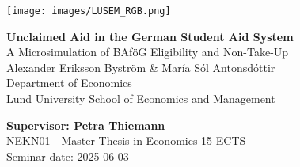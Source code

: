 
\sloppy  %

\texttt{[image: images/LUSEM\_RGB.png]} %

\vspace{2cm}
\begin{center}       
    \vspace*{2cm}
    {\LARGE \textbf{Unclaimed Aid in the German Student Aid System} \\ 
    A Microsimulation of BAföG Eligibility and Non-Take-Up} \\
    \vspace{1cm}
    \Large Alexander Eriksson Byström \& María Sól Antonsdóttir \\[0.3cm]
    \normalsize Department of Economics \\ 
    Lund University School of Economics and Management
\end{center}
\vspace{2cm}

\vfill
\noindent 
\textbf{Supervisor: Petra Thiemann} \\ 
NEKN01 - Master Thesis in Economics 15 ECTS \\ 
Seminar date: 2025-06-03
\thispagestyle{empty}

\fussy  %

\newpage
\tableofcontents
\thispagestyle{empty}
